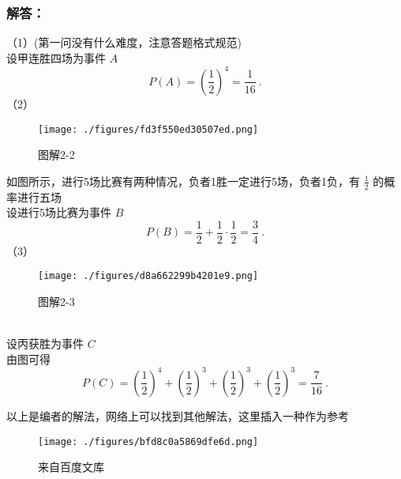 \subsubsection{解答：}
（1）(第一问没有什么难度，注意答题格式规范)\\
设甲连胜四场为事件 $A$
\begin{equation}
P(A) = (\frac{1}{2})^4 = \frac{1}{16}~.
\end{equation}
（2）
\begin{figure}[ht]
\centering
\texttt{[image: ./figures/fd3f550ed30507ed.png]}
\caption{图解2-2} \label{fig_HsPbEc_1}
\end{figure}
如图所示，进行5场比赛有两种情况，负者1胜一定进行5场，负者1负，有 $\frac{1}{2}$ 的概率进行五场\\
设进行5场比赛为事件 $B$
\begin{equation}
P(B) = \frac{1}{2} + \frac{1}{2} \cdot \frac{1}{2} = \frac{3}{4}~.
\end{equation}
（3）
\begin{figure}[ht]
\centering
\texttt{[image: ./figures/d8a662299b4201e9.png]}
\caption{图解2-3} \label{fig_HsPbEc_2}
\end{figure}\\
设丙获胜为事件 $C$\\
由图可得
\begin{equation}
P(C) = (\frac{1}{2})^4 + (\frac{1}{2})^3 + (\frac{1}{2})^3 + (\frac{1}{2})^3 = \frac{7}{16}~.
\end{equation}

以上是编者的解法，网络上可以找到其他解法，这里插入一种作为参考
\begin{figure}[ht]
\centering
\texttt{[image: ./figures/bfd8c0a5869dfe6d.png]}
\caption{来自百度文库} \label{fig_HsPbEc_3}
\end{figure}